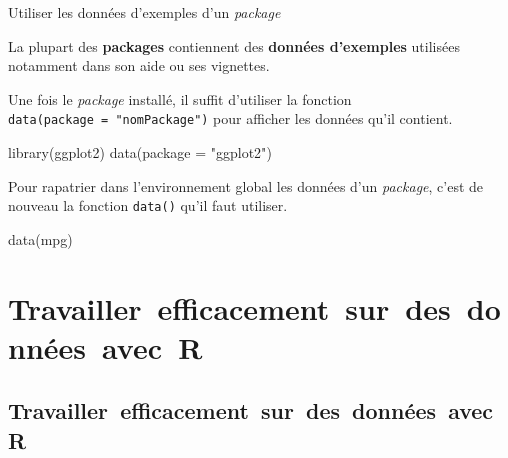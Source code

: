 \documentclass[12pt,handout,ignorenonframetext,]{beamer}
\newenvironment{Shaded}{}{}
\newcommand{\KeywordTok}[1]{\textcolor[rgb]{0.00,0.00,1.00}{{#1}}}
\newcommand{\DataTypeTok}[1]{{#1}}
\newcommand{\StringTok}[1]{\textcolor[rgb]{0.00,0.50,0.50}{{#1}}}
\newcommand{\NormalTok}[1]{{#1}}
\renewenvironment{Shaded}{\begin{snugshade}}{\end{snugshade}}
\begin{document}
\begin{frame}[fragile]{Utiliser les données d'exemples d'un
\emph{package}}

La plupart des \textbf{packages} contiennent des \textbf{données
d'exemples} utilisées notamment dans son aide ou ses vignettes.

Une fois le \emph{package} installé, il suffit d'utiliser la fonction
\texttt{data(package\ =\ "nomPackage")} pour afficher les données qu'il
contient.

\begin{Shaded}
\begin{Highlighting}[]
\KeywordTok{library}\NormalTok{(ggplot2)}
\KeywordTok{data}\NormalTok{(}\DataTypeTok{package =} \StringTok{"ggplot2"}\NormalTok{)}
\end{Highlighting}
\end{Shaded}

\pause Pour \og rapatrier \fg{} dans l'environnement global les données
d'un \emph{package}, c'est de nouveau la fonction \texttt{data()} qu'il
faut utiliser.

\begin{Shaded}
\begin{Highlighting}[]
\KeywordTok{data}\NormalTok{(mpg)}
\end{Highlighting}
\end{Shaded}

\end{frame}

\section{Travailler~efficacement~sur~des~données~avec~R}\label{travaillerefficacementsurdesdonneesavecr}

\subsection*{Travailler~efficacement~sur~des~données~avec~R}\label{travaillerefficacementsurdesdonneesavecr-1}
\end{document}
